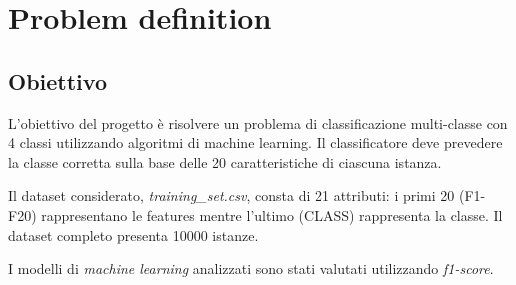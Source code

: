 \section{Problem definition}
        
        \subsection{Obiettivo}
        
                L'obiettivo del progetto è risolvere un problema di classificazione multi-classe con 4 classi utilizzando algoritmi di machine learning. Il classificatore deve prevedere la classe corretta sulla base delle 20 caratteristiche di ciascuna istanza.
                \bigbreak
            
                Il dataset considerato, \textit{training\_set.csv}, consta di 21 attributi: i primi 20 (F1-F20) rappresentano le features mentre l'ultimo (CLASS) rappresenta la classe.
                Il dataset completo presenta 10000 istanze.
                \bigbreak
                
                I modelli di \textit{machine learning} analizzati sono stati valutati utilizzando \textit{f1-score}.